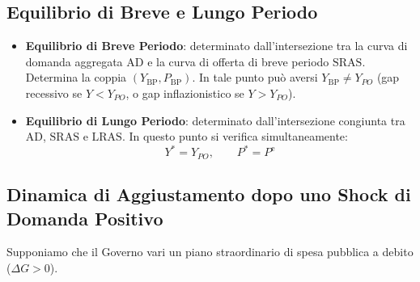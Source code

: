 \subsection{Equilibrio di Breve e Lungo Periodo}
\begin{itemize}
    \item \textbf{Equilibrio di Breve Periodo}: determinato dall'intersezione tra la curva di domanda aggregata $\mathrm{AD}$ e la curva di offerta di breve periodo $\mathrm{SRAS}$. Determina la coppia $(Y_{\text{BP}}, P_{\text{BP}})$. In tale punto può aversi $Y_{\text{BP}} \neq Y_{PO}$ (gap recessivo se $Y < Y_{PO}$, o gap inflazionistico se $Y > Y_{PO}$).
    \item \textbf{Equilibrio di Lungo Periodo}: determinato dall'intersezione congiunta tra $\mathrm{AD}$, $\mathrm{SRAS}$ e $\mathrm{LRAS}$. In questo punto si verifica simultaneamente:
    \begin{equation}
        Y^* = Y_{PO}, \qquad P^* = P^{\mathrm{e}}
    \end{equation}
\end{itemize}

\subsection{Dinamica di Aggiustamento dopo uno Shock di Domanda Positivo}
Supponiamo che il Governo vari un piano straordinario di spesa pubblica a debito ($\Delta G > 0$).

